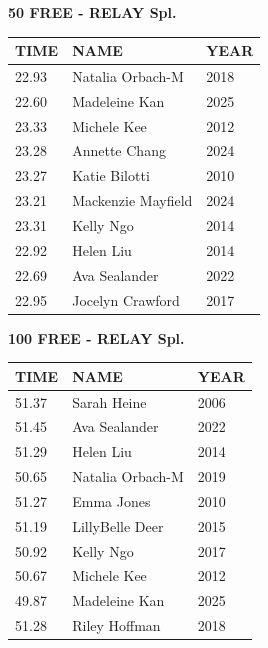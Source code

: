 \begin{table}[H]
\centering
\begin{minipage}[t]{0.6\textwidth}
\centering
\textbf{50 FREE - RELAY Spl.}\\[0.1cm]
\begin{tabular}{@{}p{1.8cm}p{2.8cm}p{1.2cm}@{}}
\hline
    \textbf{TIME} & \textbf{NAME} & \textbf{YEAR} \\
\hline
    22.93 & Natalia Orbach-M & 2018 \\
    22.60 & Madeleine Kan & 2025 \\
    23.33 & Michele Kee & 2012 \\
    23.28 & Annette Chang & 2024 \\
    23.27 & Katie Bilotti & 2010 \\
    23.21 & Mackenzie Mayfield & 2024 \\
    23.31 & Kelly Ngo & 2014 \\
    22.92 & Helen Liu & 2014 \\
    22.69 & Ava Sealander & 2022 \\
    22.95 & Jocelyn Crawford & 2017 \\
\hline
\end{tabular}
\end{minipage}
\end{table}

\begin{table}[H]
\centering
\begin{minipage}[t]{0.6\textwidth}
\centering
\textbf{100 FREE - RELAY Spl.}\\[0.1cm]
\begin{tabular}{@{}p{1.8cm}p{2.8cm}p{1.2cm}@{}}
\hline
    \textbf{TIME} & \textbf{NAME} & \textbf{YEAR} \\
\hline
    51.37 & Sarah Heine & 2006 \\
    51.45 & Ava Sealander & 2022 \\
    51.29 & Helen Liu & 2014 \\
    50.65 & Natalia Orbach-M & 2019 \\
    51.27 & Emma Jones & 2010 \\
    51.19 & LillyBelle Deer & 2015 \\
    50.92 & Kelly Ngo & 2017 \\
    50.67 & Michele Kee & 2012 \\
    49.87 & Madeleine Kan & 2025 \\
    51.28 & Riley Hoffman & 2018 \\
\hline
\end{tabular}
\end{minipage}
\end{table}

